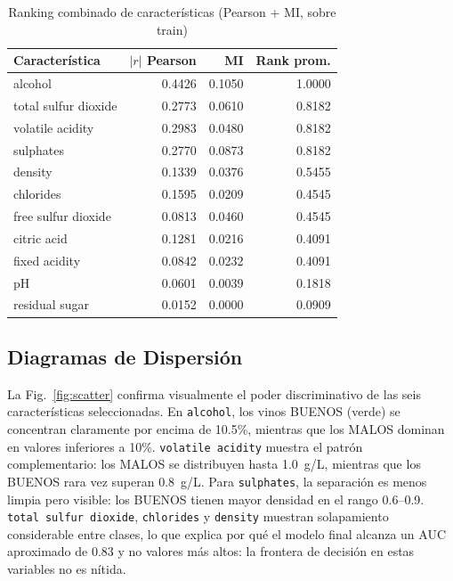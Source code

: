 \documentclass[conference]{IEEEtran}
\begin{document}
\begin{table}[H]
\caption{Ranking combinado de caracter\'{i}sticas (Pearson + MI, sobre train)}
\label{tab:feature_ranking}
\centering
\begin{tabular}{lrrr}
\toprule
\textbf{Caracter\'{i}stica} & \textbf{$|r|$ Pearson} & \textbf{MI} & \textbf{Rank prom.} \\
\midrule
alcohol              & 0.4426 & 0.1050 & 1.0000 \\
total sulfur dioxide & 0.2773 & 0.0610 & 0.8182 \\
volatile acidity     & 0.2983 & 0.0480 & 0.8182 \\
sulphates            & 0.2770 & 0.0873 & 0.8182 \\
density              & 0.1339 & 0.0376 & 0.5455 \\
chlorides            & 0.1595 & 0.0209 & 0.4545 \\
\midrule
free sulfur dioxide  & 0.0813 & 0.0460 & 0.4545 \\
citric acid          & 0.1281 & 0.0216 & 0.4091 \\
fixed acidity        & 0.0842 & 0.0232 & 0.4091 \\
pH                   & 0.0601 & 0.0039 & 0.1818 \\
residual sugar       & 0.0152 & 0.0000 & 0.0909 \\
\bottomrule
\end{tabular}
\end{table}

\subsection{Diagramas de Dispersi\'{o}n}

La Fig.~\ref{fig:scatter} confirma visualmente el poder discriminativo de las seis caracter\'{i}sticas seleccionadas. En \texttt{alcohol}, los vinos BUENOS (verde) se concentran claramente por encima de 10.5\%, mientras que los MALOS dominan en valores inferiores a 10\%. \texttt{volatile acidity} muestra el patr\'{o}n complementario: los MALOS se distribuyen hasta 1.0~g/L, mientras que los BUENOS rara vez superan 0.8~g/L. Para \texttt{sulphates}, la separaci\'{o}n es menos limpia pero visible: los BUENOS tienen mayor densidad en el rango 0.6--0.9. \texttt{total sulfur dioxide}, \texttt{chlorides} y \texttt{density} muestran solapamiento considerable entre clases, lo que explica por qu\'{e} el modelo final alcanza un AUC aproximado de 0.83 y no valores m\'{a}s altos: la frontera de decisi\'{o}n en estas variables no es n\'{i}tida.
\end{document}
